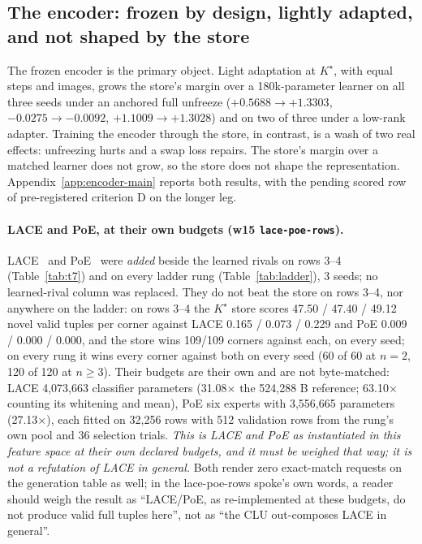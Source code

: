 \documentclass{article} %
\newcommand{\Kstar}{\ensuremath{K^{\star}}}
\begin{document}
\subsection{The encoder: frozen by design, lightly adapted, and not shaped by the store}
\label{sec:adapt}\label{sec:bard}
The frozen encoder is the primary object. Light adaptation at $\Kstar$, with equal steps and
images, grows the store's margin over a 180k-parameter learner on all three seeds under an
anchored full unfreeze ($+0.5688\to+1.3303$, $-0.0275\to-0.0092$, $+1.1009\to+1.3028$) and on two
of three under a low-rank adapter. %
Training the encoder through the store, in contrast, is a wash of two real effects: unfreezing
hurts and a swap loss repairs. The store's margin over a matched learner does not grow, so the
store does not shape the representation. Appendix~\ref{app:encoder-main} reports both results,
with the pending scored row of pre-registered criterion D on the longer leg.

\paragraph{LACE and PoE, at their own budgets (w15 \texttt{lace-poe-rows}).}
LACE~\citep{nie2021controllable} and PoE~\citep{hinton2002training} were \emph{added} beside the
learned rivals on rows 3--4 (Table~\ref{tab:t7}) and on every ladder rung
(Table~\ref{tab:ladder}), 3 seeds; no learned-rival column was replaced. They do not beat the
store on rows 3--4, nor anywhere on the ladder: on rows 3--4 the $\Kstar$ store scores 47.50 / %
47.40 / 49.12 novel valid tuples per corner against LACE 0.165 / 0.073 / 0.229 and PoE 0.009 / %
0.000 / 0.000, and the store wins 109/109 corners against each, on every seed; on every rung it %
wins every corner against both on every seed (60 of 60 at $n=2$, 120 of 120 at $n\ge3$). %
Their budgets are their own and are not byte-matched: LACE 4,073,663 classifier parameters %
(31.08$\times$ the 524,288 B reference; 63.10$\times$ counting its whitening and mean), PoE six %
experts with 3,556,665 parameters (27.13$\times$), each fitted on 32,256 rows with 512 validation %
rows from the rung's own pool and 36 selection trials. %
\emph{This is LACE and PoE as instantiated in this feature space at their own declared budgets,
and it must be weighed that way; it is not a refutation of LACE in general.} Both render zero
exact-match requests on the generation table as well; in the lace-poe-rows spoke's own words, a
reader should weigh the result as ``LACE/PoE, as re-implemented at these budgets, do not produce
valid full tuples here'', not as ``the CLU out-composes LACE in general''. %
\end{document}
